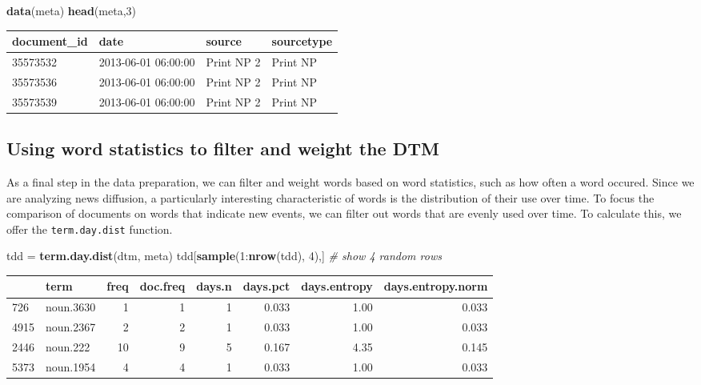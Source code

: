 \documentclass[]{article}
\newenvironment{Shaded}{\begin{snugshade}}{\end{snugshade}}
\newcommand{\KeywordTok}[1]{\textcolor[rgb]{0.13,0.29,0.53}{\textbf{{#1}}}}
\newcommand{\DecValTok}[1]{\textcolor[rgb]{0.00,0.00,0.81}{{#1}}}
\newcommand{\StringTok}[1]{\textcolor[rgb]{0.31,0.60,0.02}{{#1}}}
\newcommand{\CommentTok}[1]{\textcolor[rgb]{0.56,0.35,0.01}{\textit{{#1}}}}
\newcommand{\NormalTok}[1]{{#1}}
\begin{document}
\begin{Shaded}
\begin{Highlighting}[]
\KeywordTok{data}\NormalTok{(meta)}
\KeywordTok{head}\NormalTok{(meta,}\DecValTok{3}\NormalTok{)}
\end{Highlighting}
\end{Shaded}

\begin{longtable}[c]{@{}llll@{}}
\toprule
document\_id & date & source & sourcetype\tabularnewline
\midrule
\endhead
35573532 & 2013-06-01 06:00:00 & Print NP 2 & Print NP\tabularnewline
35573536 & 2013-06-01 06:00:00 & Print NP 2 & Print NP\tabularnewline
35573539 & 2013-06-01 06:00:00 & Print NP 2 & Print NP\tabularnewline
\bottomrule
\end{longtable}

\subsection{Using word statistics to filter and weight the
DTM}\label{using-word-statistics-to-filter-and-weight-the-dtm}

As a final step in the data preparation, we can filter and weight words
based on word statistics, such as how often a word occured. Since we are
analyzing news diffusion, a particularly interesting characteristic of
words is the distribution of their use over time. To focus the
comparison of documents on words that indicate new events, we can filter
out words that are evenly used over time. To calculate this, we offer
the \texttt{term.day.dist} function.

\begin{Shaded}
\begin{Highlighting}[]
\NormalTok{tdd =}\StringTok{ }\KeywordTok{term.day.dist}\NormalTok{(dtm, meta)}
\NormalTok{tdd[}\KeywordTok{sample}\NormalTok{(}\DecValTok{1}\NormalTok{:}\KeywordTok{nrow}\NormalTok{(tdd), }\DecValTok{4}\NormalTok{),] }\CommentTok{# show 4 random rows}
\end{Highlighting}
\end{Shaded}

\begin{longtable}[c]{@{}llrrrrrr@{}}
\toprule
& term & freq & doc.freq & days.n & days.pct & days.entropy &
days.entropy.norm\tabularnewline
\midrule
\endhead
726 & noun.3630 & 1 & 1 & 1 & 0.033 & 1.00 & 0.033\tabularnewline
4915 & noun.2367 & 2 & 2 & 1 & 0.033 & 1.00 & 0.033\tabularnewline
2446 & noun.222 & 10 & 9 & 5 & 0.167 & 4.35 & 0.145\tabularnewline
5373 & noun.1954 & 4 & 4 & 1 & 0.033 & 1.00 & 0.033\tabularnewline
\bottomrule
\end{longtable}
\end{document}
